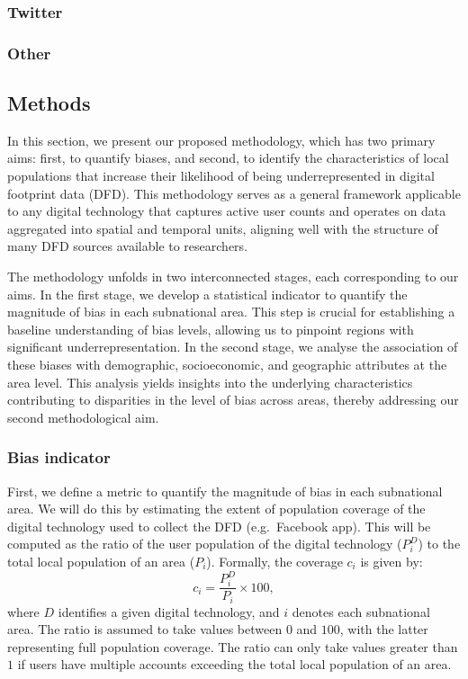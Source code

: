 \documentclass[]{rsos}%
\begin{document}
\subsubsection{Twitter}\label{twitter}

\subsubsection{Other}\label{other}

\subsection{Methods}\label{methods}

In this section, we present our proposed methodology, which has two primary aims: first, to quantify biases, and second, to identify the characteristics of local populations that increase their likelihood of being underrepresented in digital footprint data (DFD). This methodology serves as a general framework applicable to any digital technology that captures active user counts and operates on data aggregated into spatial and temporal units, aligning well with the structure of many DFD sources available to researchers.

The methodology unfolds in two interconnected stages, each corresponding to our aims. In the first stage, we develop a statistical indicator to quantify the magnitude of bias in each subnational area. This step is crucial for establishing a baseline understanding of bias levels, allowing us to pinpoint regions with significant underrepresentation. In the second stage, we analyse the association of these biases with demographic, socioeconomic, and geographic attributes at the area level. This analysis yields insights into the underlying characteristics contributing to disparities in the level of bias across areas, thereby addressing our second methodological aim.

\subsubsection{Bias indicator}\label{bias-indicator}

First, we define a metric to quantify the magnitude of bias in each subnational area. We will do this by estimating the extent of population coverage of the digital technology used to collect the DFD (e.g.~Facebook app). This will be computed as the ratio of the user population of the digital technology (\(P_i^D\)) to the total local population of an area (\(P_i\)). Formally, the coverage \(c_i\) is given by:
\begin{equation}
c_i = \dfrac{P_i^D}{P_i} \times 100,
\end{equation}
where \(D\) identifies a given digital technology, and \(i\) denotes each subnational area. The ratio is assumed to take values between \(0\) and \(100\), with the latter representing full population coverage. The ratio can only take values greater than \(1\) if users have multiple accounts exceeding the total local population of an area.
\end{document}
